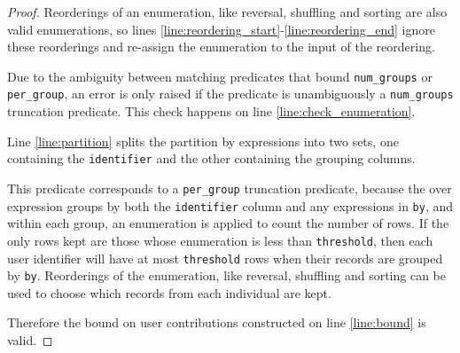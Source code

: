 \documentclass{article}
\begin{document}
\begin{proof}
    Reorderings of an enumeration, like reversal, shuffling and sorting are also valid enumerations,
    so lines \ref{line:reordering_start}-\ref{line:reordering_end} ignore these reorderings and re-assign the enumeration to the input of the reordering.

    Due to the ambiguity between matching predicates that bound \texttt{num\_groups} or \texttt{per\_group},
    an error is only raised if the predicate is unambiguously a \texttt{num\_groups} truncation predicate.
    This check happens on line \ref{line:check_enumeration}.

    Line \ref{line:partition} splits the partition by expressions into two sets,
    one containing the \texttt{identifier} and the other containing the grouping columns.

    This predicate corresponds to a \texttt{per\_group} truncation predicate,
    because the over expression groups by both the \texttt{identifier} column and any expressions in \texttt{by},
    and within each group, an enumeration is applied to count the number of rows.
    If the only rows kept are those whose enumeration is less than \texttt{threshold},
    then each user identifier will have at most \texttt{threshold} rows when their records are grouped by \texttt{by}.
    Reorderings of the enumeration, like reversal, shuffling and sorting can be used to choose which records from each individual are kept.
    
    Therefore the bound on user contributions constructed on line \ref{line:bound} is valid.
\end{proof}
\end{document}
